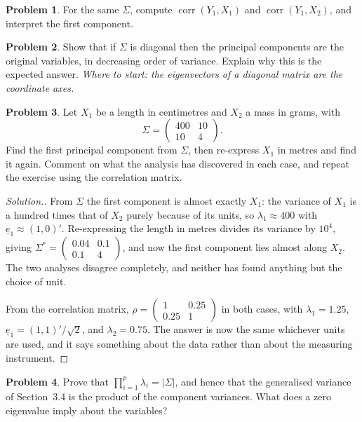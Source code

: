 \documentclass[11pt,a4paper]{article}
\theoremstyle{definition}
\newtheorem{problemx}{Problem}[section]
\newenvironment{problem}{\begin{problemx}}{\end{problemx}}
\newenvironment{solution}
  {\renewcommand{\qedsymbol}{}\begin{proof}[\textit{Solution}.]}
  {\end{proof}}
\begin{document}
\begin{problem}
For the same $\Sigma$, compute $\operatorname{corr}(Y_1,X_1)$ and
$\operatorname{corr}(Y_1,X_2)$, and interpret the first component.
\end{problem}

\begin{problem}
Show that if $\Sigma$ is diagonal then the principal components are the original
variables, in decreasing order of variance. Explain why this is the expected
answer.
\emph{Where to start: the eigenvectors of a diagonal matrix are the coordinate
axes.}
\end{problem}

\begin{problem}
Let $X_1$ be a length in centimetres and $X_2$ a mass in grams, with
$$\Sigma = \begin{pmatrix} 400 & 10\\ 10 & 4\end{pmatrix}.$$
Find the first principal component from $\Sigma$, then re-express $X_1$ in
metres and find it again. Comment on what the analysis has discovered in each
case, and repeat the exercise using the correlation matrix.
\end{problem}

\begin{solution}
From $\Sigma$ the first component is almost exactly $X_1$: the variance of $X_1$
is a hundred times that of $X_2$ purely because of its units, so
$\lambda_1\approx400$ with $\underline{e}_1\approx(1,0)'$. Re-expressing the
length in metres divides its variance by $10^{4}$, giving
$\Sigma^{*} = \begin{pmatrix}0.04 & 0.1\\ 0.1 & 4\end{pmatrix}$, and now the
first component lies almost along $X_2$. The two analyses disagree completely,
and neither has found anything but the choice of unit.

From the correlation matrix, $\rho = \begin{pmatrix}1 & 0.25\\ 0.25 & 1\end{pmatrix}$
in both cases, with $\lambda_1 = 1.25$, $\underline{e}_1 = (1,1)'/\sqrt2$, and
$\lambda_2 = 0.75$. The answer is now the same whichever units are used, and it
says something about the data rather than about the measuring instrument.
\end{solution}

\begin{problem}
Prove that $\prod^{p}_{i=1}\lambda_i = \left|\Sigma\right|$, and hence that the
generalised variance of Section~3.4 is the product of the component variances.
What does a zero eigenvalue imply about the variables?
\end{problem}
\end{document}
